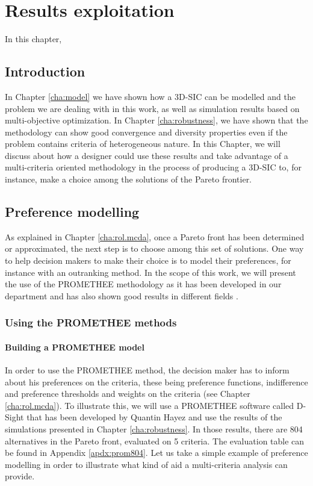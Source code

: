 \chapter{Results exploitation}
\label{cha:resultsexploit}

\begin{summary}
In this chapter,
\end{summary}

\section{Introduction}
In Chapter \ref{cha:model} we have shown how a 3D-SIC can be modelled and the problem we are dealing with in this work, as well as simulation results based on multi-objective optimization. In Chapter \ref{cha:robustness}, we have shown that the methodology can show good convergence and diversity properties even if the problem contains criteria of heterogeneous nature. In this Chapter, we will discuss about how a designer could use these results and take advantage of a multi-criteria oriented methodology in the process of producing a 3D-SIC to, for instance, make a choice among the solutions of the Pareto frontier.

\section{Preference modelling}
As explained in Chapter \ref{cha:rol.mcda}, once a Pareto front has been determined or approximated, the next step is to choose among this set of solutions. One way to help decision makers to make their choice is to model their preferences, for instance with an outranking method. In the scope of this work, we will present the use of the PROMETHEE methodology as it has been developed in our department and has also shown good results in different fields \cite{Beh2010}.

\subsection{Using the PROMETHEE methods}

\subsubsection{Building a PROMETHEE model}
In order to use the PROMETHEE method, the decision maker has to inform about his preferences on the criteria, these being preference functions, indifference and preference thresholds and weights on the criteria (see Chapter \ref{cha:rol.mcda}). To illustrate this, we will use a PROMETHEE software called D-Sight that has been developed by Quantin Hayez and use the results of the simulations presented in Chapter \ref{cha:robustness}. In those results, there are 804 alternatives in the Pareto front, evaluated on 5 criteria. The evaluation table can be found in Appendix \ref{apdx:prom804}. Let us take a simple example of preference modelling in order to illustrate what kind of aid a multi-criteria analysis can provide.

